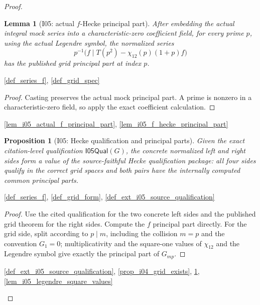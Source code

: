 \documentclass[11pt,a4paper]{article}
\numberwithin{equation}{section}
\theoremstyle{plain}\newtheorem{theorem}{Theorem}[section]\newaliascnt{proposition}{theorem}\newtheorem{proposition}[proposition]{Proposition}\aliascntresetthe{proposition}\newaliascnt{lemma}{theorem}\newtheorem{lemma}[lemma]{Lemma}\aliascntresetthe{lemma}
\theoremstyle{definition}\newaliascnt{definition}{theorem}\newtheorem{definition}[definition]{Definition}\aliascntresetthe{definition}\newaliascnt{notation}{theorem}\newtheorem{notation}[notation]{Notation}\aliascntresetthe{notation}
\providecommand{\lean}[1]{}\providecommand{\leanok}{}
\begin{document}
\begin{proof}
\begin{lemma}[I05: actual \(f\)-Hecke principal part]\label{lem_i05_actual_f_hecke_principal_part}\lean{SptCM.Analytic.Repaired.actualFHeckeDifference_legendre_hasGridPrincipalPart}\leanok
After embedding the actual integral mock series into a characteristic-zero
coefficient field, for every prime \(p\), using the actual Legendre symbol,
the normalized series
\[
 p^{-1}\bigl(f\mid T(p^2)-\chi_{12}(p)(1+p)f\bigr)
\]
has the published grid principal part at index \(p\).
\end{lemma}
\begin{uses-statement}\ref{def_series_f}, \ref{def_grid_spec}\end{uses-statement}
\begin{proof}
Casting preserves the actual mock principal part.  A prime is nonzero in a
characteristic-zero field, so apply the exact coefficient calculation.
\end{proof}
\begin{uses-proof}\ref{lem_i05_actual_f_principal_part}, \ref{lem_i05_f_hecke_principal_part}\end{uses-proof}

\begin{proposition}[I05: Hecke qualification and principal parts]\label{prop_i05_hecke_qualifications}\lean{SptCM.Analytic.Repaired.actualHeckeQualificationData_exists}\leanok
Given the exact citation-level qualification $\mathsf{I05Qual}(G)$, the
concrete normalized left and right sides form a value of the source-faithful
Hecke qualification package: all four sides qualify in the correct grid
spaces and both pairs have the internally computed common principal parts.
\end{proposition}
\begin{uses-statement}\ref{def_series_f}, \ref{def_grid_form}, \ref{def_ext_i05_source_qualification}\end{uses-statement}
\begin{proof}
Use the cited qualification for the two concrete left sides and the published
grid theorem for the right sides.  Compute the $f$ principal part directly.
For the grid side, split according to $p\mid m$, including the collision
$m=p$ and the convention $G_1=0$; multiplicativity and the square-one values
of $\chi_{12}$ and the Legendre symbol give exactly the principal part of
$G_{mp}$.
\end{proof}
\begin{uses-proof}\ref{def_ext_i05_source_qualification}, \ref{prop_i04_grid_exists}, \ref{lem_i05_actual_f_hecke_principal_part}, \ref{lem_i05_legendre_square_values}\end{uses-proof}


\end{proof}
\end{document}
